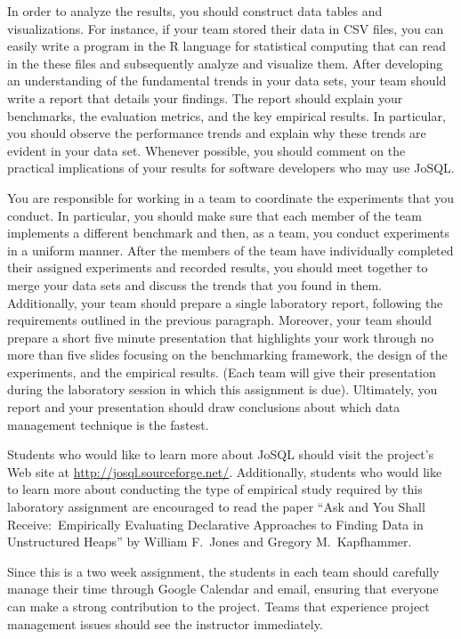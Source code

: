 In order to analyze the results, you should construct data tables and visualizations.  For instance, if your team stored
their data in CSV files, you can easily write a program in the R language for statistical computing that can read in the
these files and subsequently analyze and visualize them. After developing an understanding of the fundamental
trends in your data sets, your team should write a report that details your findings.  The report should explain your
benchmarks, the evaluation metrics, and the key empirical results.  In particular, you should observe the performance
trends and explain why these trends are evident in your data set.  Whenever possible, you should comment on the
practical implications of your results for software developers who may use JoSQL.  

You are responsible for working in a team to coordinate the experiments that you conduct.  In particular, you should
make sure that each member of the team implements a different benchmark and then, as a team, you conduct experiments in
a uniform manner.  After the members of the team have individually completed their assigned experiments and recorded
results, you should meet together to merge your data sets and discuss the trends that you found in them.  Additionally,
your team should prepare a single laboratory report, following the requirements outlined in the previous paragraph.
Moreover, your team should prepare a short five minute presentation that highlights your work through no more than five
slides focusing on the benchmarking framework, the design of the experiments, and the empirical results. (Each team will
  give their presentation during the laboratory session in which this assignment is due). Ultimately, you report and
your presentation should draw conclusions about which data management technique is the fastest.

Students who would like to learn more about JoSQL should visit the project's Web site at
\url{http://josql.sourceforge.net/}. Additionally, students who would like to learn more about conducting the type of
empirical study required by this laboratory assignment are encouraged to read the paper ``Ask and You Shall Receive:\
Empirically Evaluating Declarative Approaches to Finding Data in Unstructured Heaps'' by William F.\ Jones and Gregory
M.\ Kapfhammer.

Since this is a two week assignment, the students in each team should carefully manage their time through Google
Calendar and email, ensuring that everyone can make a strong contribution to the project. Teams that experience project
management issues should see the instructor immediately.

